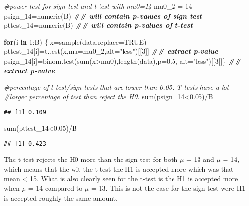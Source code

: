 \documentclass[
]{article}
\newenvironment{Shaded}{\begin{snugshade}}{\end{snugshade}}
\newcommand{\AttributeTok}[1]{\textcolor[rgb]{0.77,0.63,0.00}{#1}}
\newcommand{\CommentTok}[1]{\textcolor[rgb]{0.56,0.35,0.01}{\textit{#1}}}
\newcommand{\ConstantTok}[1]{\textcolor[rgb]{0.00,0.00,0.00}{#1}}
\newcommand{\ControlFlowTok}[1]{\textcolor[rgb]{0.13,0.29,0.53}{\textbf{#1}}}
\newcommand{\DecValTok}[1]{\textcolor[rgb]{0.00,0.00,0.81}{#1}}
\newcommand{\DocumentationTok}[1]{\textcolor[rgb]{0.56,0.35,0.01}{\textbf{\textit{#1}}}}
\newcommand{\FloatTok}[1]{\textcolor[rgb]{0.00,0.00,0.81}{#1}}
\newcommand{\FunctionTok}[1]{\textcolor[rgb]{0.00,0.00,0.00}{#1}}
\newcommand{\NormalTok}[1]{#1}
\newcommand{\OtherTok}[1]{\textcolor[rgb]{0.56,0.35,0.01}{#1}}
\newcommand{\SpecialCharTok}[1]{\textcolor[rgb]{0.00,0.00,0.00}{#1}}
\newcommand{\StringTok}[1]{\textcolor[rgb]{0.31,0.60,0.02}{#1}}
\begin{document}
\begin{Shaded}
\begin{Highlighting}[]
\CommentTok{\#power test for sign test and t{-}test with mu0=14}
\NormalTok{mu0\_2 }\OtherTok{=} \DecValTok{14}
\NormalTok{psign\_14}\OtherTok{=}\FunctionTok{numeric}\NormalTok{(B) }\DocumentationTok{\#\# will contain p{-}values of sign test}
\NormalTok{pttest\_14}\OtherTok{=}\FunctionTok{numeric}\NormalTok{(B) }\DocumentationTok{\#\# will contain p{-}values of t{-}test}

\ControlFlowTok{for}\NormalTok{(i }\ControlFlowTok{in} \DecValTok{1}\SpecialCharTok{:}\NormalTok{B) \{}
\NormalTok{  x}\OtherTok{=}\FunctionTok{sample}\NormalTok{(data,}\AttributeTok{replace=}\ConstantTok{TRUE}\NormalTok{)}
\NormalTok{  pttest\_14[i]}\OtherTok{=}\FunctionTok{t.test}\NormalTok{(x,}\AttributeTok{mu=}\NormalTok{mu0\_2,}\AttributeTok{alt=}\StringTok{"less"}\NormalTok{)[[}\DecValTok{3}\NormalTok{]] }\DocumentationTok{\#\# extract p{-}value}
\NormalTok{  psign\_14[i]}\OtherTok{=}\FunctionTok{binom.test}\NormalTok{(}\FunctionTok{sum}\NormalTok{(x}\SpecialCharTok{\textgreater{}}\NormalTok{mu0),}\FunctionTok{length}\NormalTok{(data),}\AttributeTok{p=}\FloatTok{0.5}\NormalTok{, }\AttributeTok{alt=}\StringTok{"less"}\NormalTok{)[[}\DecValTok{3}\NormalTok{]]\} }\DocumentationTok{\#\# extract p{-}value}

\CommentTok{\#percentage of t test/sign tests that are lower than 0.05. T tests have a lot}
\CommentTok{\#larger percentage of test than reject the H0.}
\FunctionTok{sum}\NormalTok{(psign\_14}\SpecialCharTok{\textless{}}\FloatTok{0.05}\NormalTok{)}\SpecialCharTok{/}\NormalTok{B}
\end{Highlighting}
\end{Shaded}

\begin{verbatim}
## [1] 0.109
\end{verbatim}

\begin{Shaded}
\begin{Highlighting}[]
\FunctionTok{sum}\NormalTok{(pttest\_14}\SpecialCharTok{\textless{}}\FloatTok{0.05}\NormalTok{)}\SpecialCharTok{/}\NormalTok{B}
\end{Highlighting}
\end{Shaded}

\begin{verbatim}
## [1] 0.423
\end{verbatim}

The t-test rejects the H0 more than the sign test for both \(\mu\) = 13
and \(\mu\) = 14, which means that the wit the t-test the H1 is accepted
more which was that mean \textless{} 15. What is also clearly seen for
the t-test is the H1 is accepted more when \(\mu\) = 14 compared to
\(\mu\) = 13. This is not the case for the sign test were H1 is accepted
roughly the same amount.
\end{document}
